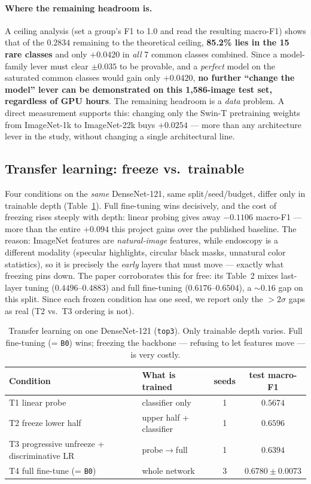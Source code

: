 \documentclass[11pt,a4paper]{article}
\newcommand{\macroF}{\textup{macro-F1}}   %
\begin{document}
\paragraph{Where the remaining headroom is.}
A ceiling analysis (set a group's F1 to 1.0 and read the resulting \macroF{})
shows that of the $0.2834$ remaining to the theoretical ceiling, \textbf{85.2\%
lies in the 15 rare classes} and only $+0.0420$ in \emph{all} 7 common classes
combined. Since a model-family lever must clear $\pm0.035$ to be provable, and a
\emph{perfect} model on the saturated common classes would gain only $+0.0420$,
\textbf{no further ``change the model'' lever can be demonstrated on this
1{,}586-image test set, regardless of GPU hours}. The remaining headroom is a
\emph{data} problem. A direct measurement supports this: changing only the Swin-T
pretraining weights from ImageNet-1k to ImageNet-22k buys $+0.0254$ --- more than
any architecture lever in the study, without changing a single architectural
line.

\subsection{Transfer learning: freeze vs.\ trainable}
\label{sec:transfer}
Four conditions on the \emph{same} DenseNet-121, same split/seed/budget, differ
only in trainable depth (Table~\ref{tab:transfer}). Full fine-tuning wins
decisively, and the cost of freezing rises steeply with depth: linear probing
gives away $-0.1106$ \macroF{} --- more than the entire $+0.094$ this project
gains over the published baseline. The reason: ImageNet features are
\emph{natural-image} features, while endoscopy is a different modality
(specular highlights, circular black masks, unnatural color statistics), so it
is precisely the \emph{early} layers that must move --- exactly what freezing
pins down. The paper corroborates this for free: its Table~2 mixes last-layer
tuning ($0.4496$--$0.4883$) and full fine-tuning ($0.6176$--$0.6504$), a $\sim0.16$
gap on this split. Since each frozen condition has one seed, we report only the
$>2\sigma$ gaps as real (T2 vs.\ T3 ordering is not).

\begin{table}[t]
\centering
\caption{Transfer learning on one DenseNet-121 (\texttt{top3}). Only trainable
depth varies. Full fine-tuning (= \texttt{B0}) wins; freezing the backbone ---
refusing to let features move --- is very costly.}
\label{tab:transfer}
\begin{tabular}{l l c c}
\toprule
Condition & What is trained & seeds & test \macroF{} \\
\midrule
T1 linear probe & classifier only & 1 & $0.5674$ \\
T2 freeze lower half & upper half + classifier & 1 & $0.6596$ \\
T3 progressive unfreeze + discriminative LR & probe$\to$full & 1 & $0.6394$ \\
T4 full fine-tune (= \texttt{B0}) & whole network & 3 & $\mathbf{0.6780\pm0.0073}$ \\
\bottomrule
\end{tabular}
\end{table}
\end{document}
